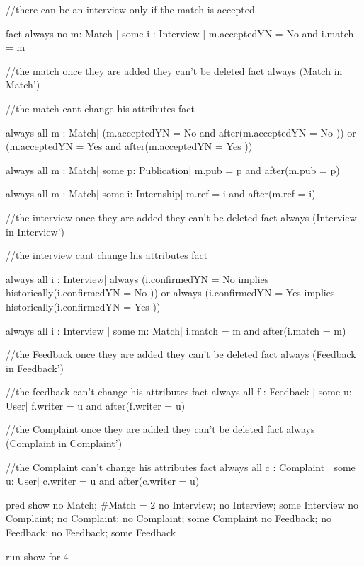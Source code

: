 \documentclass{article}
\begin{document}
\begin{spverbatim}
//there can be an interview only if the match is accepted

fact{
    always no m: Match | some i : Interview |
        m.acceptedYN = No and i.match = m 
}



//the match once they are added they can't be deleted
fact {
    always (Match in Match')
}

//the match cant change his attributes
fact{
    always all m : Match|
       (m.acceptedYN = No and after(m.acceptedYN = No ))
      or 
       (m.acceptedYN = Yes and after(m.acceptedYN = Yes ))
    
    always all m : Match| some p: Publication|
        m.pub = p and after(m.pub = p)
    
    always all m : Match| some i: Internship|
        m.ref = i and after(m.ref = i)
}


//the interview once they are added they can't be deleted
fact{
    always (Interview in Interview')
}

//the interview cant change his attributes 
fact{
    always all i : Interview|
      always (i.confirmedYN = No implies historically(i.confirmedYN = No ))
      or 
      always (i.confirmedYN = Yes implies historically(i.confirmedYN = Yes ))
    
    always all i : Interview  | some m: Match|
        i.match = m and after(i.match = m)
    
}

//the Feedback once they are added they can't be deleted
fact {
    always (Feedback in Feedback')
}

//the feedback can't change his attributes 
fact{
    always all f : Feedback  | some u: User|
        f.writer = u and after(f.writer = u)    
}

//the Complaint once they are added they can't be deleted
fact{
    always (Complaint in Complaint')
}

//the Complaint can't change his attributes 
fact{
    always all c : Complaint  | some u: User|
       c.writer = u and after(c.writer = u)    
}

pred show{
    no Match; #Match = 2
    no Interview; no Interview; some Interview
    no Complaint; no Complaint; no Complaint; some Complaint
    no Feedback; no Feedback; no Feedback; some Feedback
}


run show for 4
\end{spverbatim}
\end{document}
